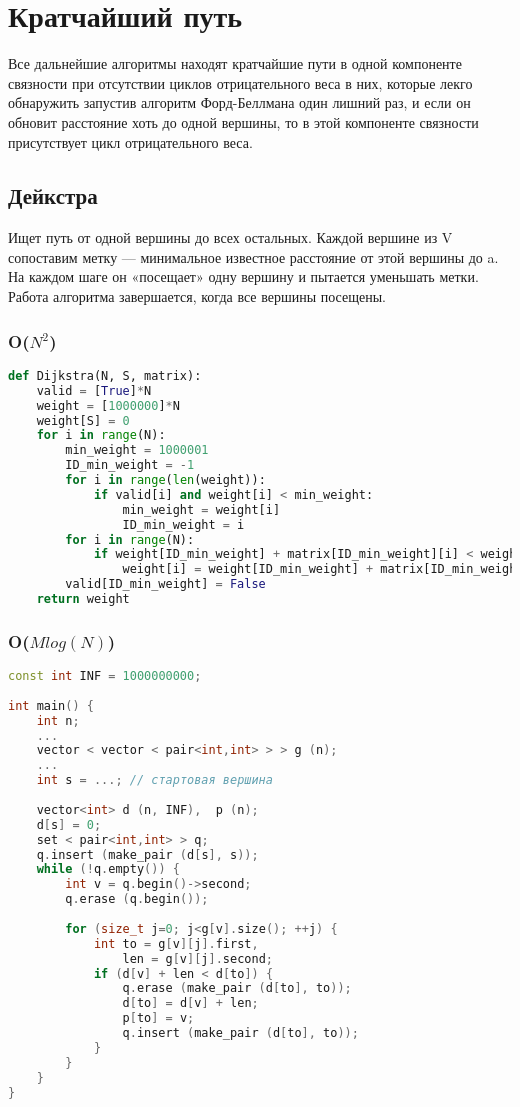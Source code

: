\section{Кратчайший путь}
Все дальнейшие алгоритмы находят кратчайшие пути в одной компоненте связности при отсутствии циклов отрицательного веса в них, которые лекго обнаружить запустив алгоритм Форд-Беллмана один лишний раз, и если он обновит расстояние хоть до одной вершины, то в этой компоненте связности присутствует цикл отрицательного веса.
\subsection{Дейкстра}
Ищет путь от одной вершины до всех остальных. Каждой вершине из V сопоставим метку — минимальное известное расстояние от этой вершины до a. На каждом шаге он «посещает» одну вершину и пытается уменьшать метки. Работа алгоритма завершается, когда все вершины посещены.
\subsubsection{O($N^2$)}
\begin{lstlisting}[language=Python]
def Dijkstra(N, S, matrix):
	valid = [True]*N        
	weight = [1000000]*N
	weight[S] = 0
	for i in range(N):
		min_weight = 1000001
		ID_min_weight = -1
		for i in range(len(weight)):
			if valid[i] and weight[i] < min_weight:
				min_weight = weight[i]
				ID_min_weight = i
		for i in range(N):
			if weight[ID_min_weight] + matrix[ID_min_weight][i] < weight[i]:
				weight[i] = weight[ID_min_weight] + matrix[ID_min_weight][i]
		valid[ID_min_weight] = False
	return weight
\end{lstlisting}
\subsubsection{O($Mlog(N)$)}
\begin{lstlisting}[language=C++]
const int INF = 1000000000;
 
int main() {
	int n;
	...
	vector < vector < pair<int,int> > > g (n);
	...
	int s = ...; // стартовая вершина
 
	vector<int> d (n, INF),  p (n);
	d[s] = 0;
	set < pair<int,int> > q;
	q.insert (make_pair (d[s], s));
	while (!q.empty()) {
		int v = q.begin()->second;
		q.erase (q.begin());
 
		for (size_t j=0; j<g[v].size(); ++j) {
			int to = g[v][j].first,
				len = g[v][j].second;
			if (d[v] + len < d[to]) {
				q.erase (make_pair (d[to], to));
				d[to] = d[v] + len;
				p[to] = v;
				q.insert (make_pair (d[to], to));
			}
		}
	}
}
\end{lstlisting}
